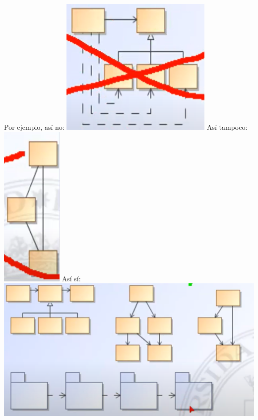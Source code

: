 \documentclass[a4paper,11pt]{article}
\begin{document}
Por ejemplo, así no:
\includegraphics{assets/cicl.PNG}
Así tampoco:
\includegraphics{assets/cicl2.PNG}
Así sí:
\includegraphics{assets/good cicl.PNG}
\end{document}
